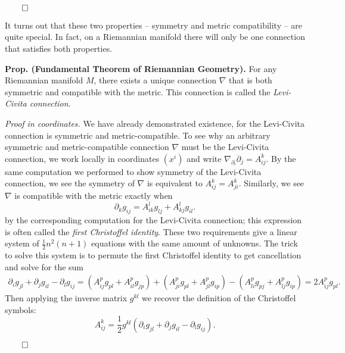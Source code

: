 \documentclass[
]{article}
\renewcommand{\square}{\hfill\qed}
\begin{document}
\(\square\)

It turns out that these two properties -- symmetry and metric
compatibility -- are quite special. In fact, on a Riemannian manifold
there will only be one connection that satisfies both properties.

\textbf{Prop. (Fundamental Theorem of Riemannian Geometry).} For any
Riemannian manifold \(M\), there exists a unique connection \(\nabla\)
that is both symmetric and compatible with the metric. This connection
is called the \emph{Levi-Civita connection}.

\emph{Proof in coordinates.} We have already demonstrated existence, for
the Levi-Civita connection is symmetric and metric-compatible. To see
why an arbitrary symmetric and metric-compatible connection \(\nabla\)
must be the Levi-Civita connection, we work locally in coordinates
\((x^i)\) and write \(\nabla_{\partial_i}\partial_j = A_{ij}^k\). By the
same computation we performed to show symmetry of the Levi-Civita
connection, we see the symmetry of \(\nabla\) is equivalent to
\(A_{ij}^k = A_{ji}^k\). Similarly, we see \(\nabla\) is compatible with
the metric exactly when \[
   \partial_kg_{ij} = A_{ik}^lg_{lj} + A_{kj}^lg_{il}.
\] by the corresponding computation for the Levi-Civita connection; this
expression is often called the \emph{first Christoffel identity}. These
two requirements give a linear system of \(\frac{1}{2}n^2(n+1)\)
equations with the same amount of unknowns. The trick to solve this
system is to permute the first Christoffel identity to get cancellation
and solve for the sum \begin{align}
    \partial_i g_{jl} + \partial_j g_{il} - \partial_l g_{ij}
    = (A_{ij}^p g_{pl} + A_{il}^p g_{jp}) + (A_{ji}^p g_{pl} + A_{jl}^p g_{ip}) - (A^p_{li} g_{pj} + A_{lj}^p g_{ip})
    = 2A_{ij}^p g_{pl}.
\end{align} Then applying the inverse matrix \(g^{kl}\) we recover the
definition of the Christoffel symbols: \[
    A_{ij}^k = \frac{1}{2}g^{kl}(\partial_i g_{jl} + \partial_j g_{il} - \partial_l g_{ij}).
\]

\(\square\)
\end{document}
